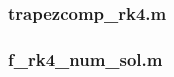 \subsubsection{trapezcomp\_rk4.m}
\label{apendix:file_trapezcomp_rk4}

\clearpage

\subsubsection{f\_rk4\_num\_sol.m}
\label{apendix:file_f_rk4_num_sol}

\clearpage

\normalfont
\normalsize







